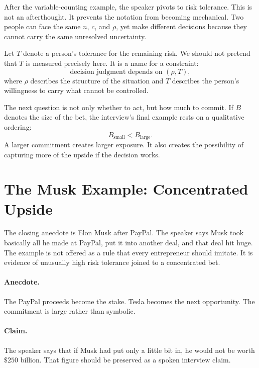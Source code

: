After the variable-counting example, the speaker pivots to risk tolerance. This is not an afterthought. It prevents the notation from becoming mechanical. Two people can face the same \(n\), \(c\), and \(\rho\), yet make different decisions because they cannot carry the same unresolved uncertainty.

Let \(T\) denote a person's tolerance for the remaining risk. We should not pretend that \(T\) is measured precisely here. It is a name for a constraint:
\begin{equation}
\text{decision judgment depends on }(\rho,T),
\end{equation}
where \(\rho\) describes the structure of the situation and \(T\) describes the person's willingness to carry what cannot be controlled.

The next question is not only whether to act, but how much to commit. If \(B\) denotes the size of the bet, the interview's final example rests on a qualitative ordering:
\begin{equation}
B_{\mathrm{small}}<B_{\mathrm{large}}.
\end{equation}
A larger commitment creates larger exposure. It also creates the possibility of capturing more of the upside if the decision works.

\section{The Musk Example: Concentrated Upside}

The closing anecdote is Elon Musk after PayPal. The speaker says Musk took basically all he made at PayPal, put it into another deal, and that deal hit huge. The example is not offered as a rule that every entrepreneur should imitate. It is evidence of unusually high risk tolerance joined to a concentrated bet.

\paragraph{Anecdote.}
The PayPal proceeds become the stake. Tesla becomes the next opportunity. The commitment is large rather than symbolic.

\paragraph{Claim.}
The speaker says that if Musk had put only a little bit in, he would not be worth \(\$250\) billion. That figure should be preserved as a spoken interview claim.


